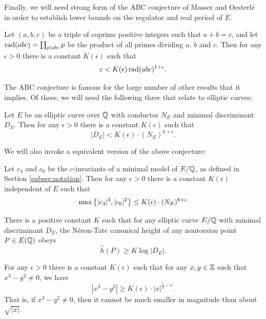 \documentclass[10pt]{article}
\begin{document}
Finally, we will need strong form of the ABC conjecture of Masser and Oesterl\'{e} in order to establish lower bounds on the regulator and real period of $E$.
\begin{conjecture} \label{conj:ABC}
Let $(a,b,c)$ be a triple of coprime positive integers such that $a+b = c$, and let $\operatorname{rad}(abc) = \prod_{p | abc} p$ be the product of all primes dividing $a$, $b$ and $c$. Then for any $\epsilon > 0$ there is a constant $K(\epsilon)$ such that
\begin{equation}
c < K(\epsilon)\operatorname{rad}(abc)^{1+\epsilon}.
\end{equation}
\end{conjecture}
The ABC conjecture is famous for the large number of other results that it implies. Of these, we will need the following three that relate to elliptic curves:

\begin{conjecture}[Szpiro]\label{conj:Szpiro}
Let $E$ be an elliptic curve over $\mathbb{Q}$ with conductor $N_E$ and minimal discriminant $D_E$. Then for any $\epsilon > 0$ there is a constant $K(\epsilon)$ such that
\begin{equation}
|D_E| < K(\epsilon)\cdot (N_E)^{6+\epsilon}.
\end{equation}
\end{conjecture}

We will also invoke a equivalent version of the above conjecture:
\begin{conjecture}\label{conj:modified_szpiro}
Let $c_4$ and $c_6$ be the $c$-invariants of a minimal model of $E/\mathbb{Q}$, as defined in Section \ref{subsec:notation}. Then for any $\epsilon>0$ there is a constant $K(\epsilon)$ independent of $E$ such that
\begin{equation}
\max\left\{|c_4|^3,|c_6|^2\right\} \le K(\epsilon)\cdot (N_E)^{6+\epsilon}
\end{equation}
\end{conjecture}

\begin{conjecture}[Lang]\label{conj:Lang}
There is a positive constant $K$ such that for any elliptic curve $E/\mathbb{Q}$ with minimal discriminant $D_E$, the N\'{e}ron-Tate canonical height of any nontorsion point $P\in E(\mathbb{Q})$ obeys
\begin{equation}
\hat{h}(P) \ge K\log |D_E|.
\end{equation}
\end{conjecture}

\begin{conjecture}[Hall]\label{conj:Hall}
For any $\epsilon > 0$ there is a constant $K(\epsilon)$ such that for any $x,y \in \mathbb{Z}$ such that $x^3-y^2 \ne 0$, we have
\begin{equation}
|x^3-y^2| \ge K(\epsilon)\cdot |x|^{\frac{1}{2}-\epsilon}.
\end{equation}
That is, if $x^3-y^2 \ne 0$, then it cannot be much smaller in magnitude than about $\sqrt{|x|}$.
\end{conjecture}
\end{document}
